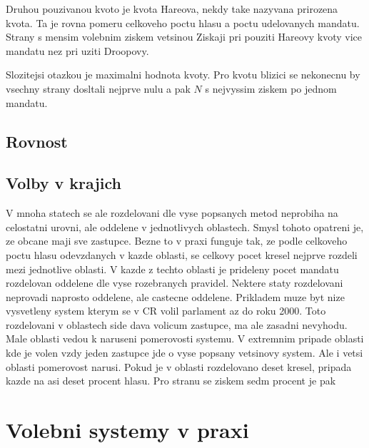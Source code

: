 \documentclass[12pt,a4paper]{report}
\begin{document}
Druhou pouzivanou kvoto je kvota Hareova, nekdy take nazyvana prirozena kvota. Ta je rovna pomeru celkoveho poctu hlasu a poctu udelovanych mandatu.
Strany s mensim volebnim ziskem vetsinou Ziskaji pri pouziti Hareovy kvoty vice mandatu nez pri uziti Droopovy.  

Slozitejsi otazkou je maximalni hodnota kvoty.
Pro kvotu blizici se nekonecnu by vsechny strany dosltali nejprve nulu a pak $N$ s nejvyssim ziskem po jednom mandatu.


\section{Rovnost}

\section{Volby v krajich}
V mnoha statech se ale rozdelovani dle vyse popsanych metod neprobiha na celostatni urovni, ale oddelene v jednotlivych oblastech.
Smysl tohoto opatreni je, ze obcane maji sve  zastupce.
Bezne to v praxi funguje tak, ze podle celkoveho poctu hlasu odevzdanych v kazde oblasti, se celkovy pocet kresel nejprve rozdeli mezi jednotlive oblasti.
V kazde z techto oblasti je prideleny pocet mandatu rozdelovan oddelene dle vyse rozebranych pravidel.
Nektere staty rozdelovani neprovadi naprosto oddelene, ale castecne oddelene.
Prikladem muze byt nize vysvetleny system kterym se v CR volil parlament az do roku 2000. %
Toto rozdelovani v oblastech side dava volicum  zastupce, ma ale zasadni nevyhodu.
Male oblasti vedou k naruseni pomerovosti systemu.
V extremnim pripade oblasti kde je volen vzdy jeden zastupce jde o vyse popsany vetsinovy system. 
Ale i vetsi oblasti pomerovost narusi.
Pokud je v oblasti rozdelovano deset kresel, pripada kazde na asi deset procent hlasu.
Pro stranu se ziskem sedm procent je pak

\chapter{Volebni systemy v praxi}
\end{document}
